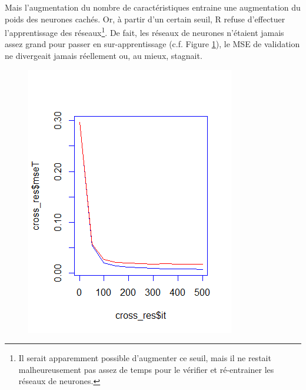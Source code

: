 Mais l'augmentation du nombre de caractéristiques entraine une augmentation du poids des neurones cachés. Or, à partir d'un certain seuil, R refuse d'effectuer l'apprentissage des réseaux\footnote{Il serait apparemment possible d'augmenter ce seuil, mais il ne restait malheureusement pas assez de temps pour le vérifier et ré-entrainer les réseaux de neurones.}. De fait, les réseaux de neurones n'étaient jamais assez grand pour passer en sur-apprentissage (c.f. Figure \ref{fig:mse}), le MSE de validation ne divergeait jamais réellement ou, au mieux, stagnait.
\begin{figure}

\begin{minipage}{0.5\linewidth}
\includegraphics[width=\linewidth]{Figures/mse}
\label{fig:mse}
\end{minipage}
\begin{minipage}{0.5\linewidth}

\end{minipage}
\end{figure}
